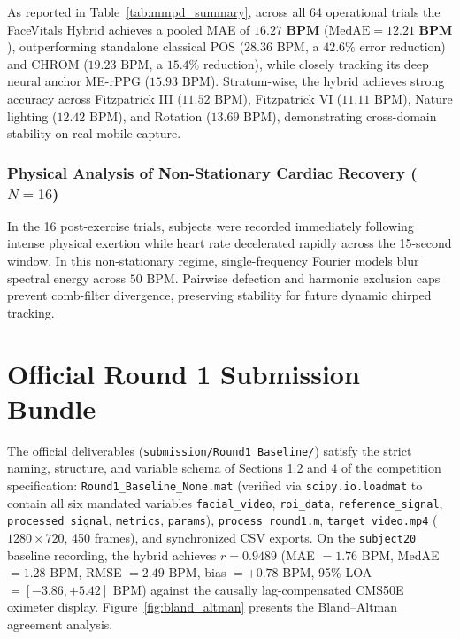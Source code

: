 \documentclass[conference]{IEEEtran}
\begin{document}
As reported in Table~\ref{tab:mmpd_summary}, across all 64 operational trials the FaceVitals Hybrid achieves a pooled MAE of $\mathbf{16.27\text{ BPM}}$ ($\text{MedAE} = \mathbf{12.21\text{ BPM}}$), outperforming standalone classical POS ($28.36\text{ BPM}$, a $42.6\%$ error reduction) and CHROM ($19.23\text{ BPM}$, a $15.4\%$ reduction), while closely tracking its deep neural anchor ME-rPPG ($15.93\text{ BPM}$). Stratum-wise, the hybrid achieves strong accuracy across Fitzpatrick III ($11.52\text{ BPM}$), Fitzpatrick VI ($11.11\text{ BPM}$), Nature lighting ($12.42\text{ BPM}$), and Rotation ($13.69\text{ BPM}$), demonstrating cross-domain stability on real mobile capture.

\subsubsection{Physical Analysis of Non-Stationary Cardiac Recovery ($N=16$)}
In the 16 post-exercise trials, subjects were recorded immediately following intense physical exertion while heart rate decelerated rapidly across the 15-second window. In this non-stationary regime, single-frequency Fourier models blur spectral energy across $50\text{ BPM}$. Pairwise defection and harmonic exclusion caps prevent comb-filter divergence, preserving stability for future dynamic chirped tracking.

\section{Official Round 1 Submission Bundle}

The official deliverables (\texttt{submission/Round1\_Baseline/}) satisfy
the strict naming, structure, and variable schema of Sections 1.2 and 4 of
the competition specification: \texttt{Round1\_Baseline\_None.mat} (verified
via \texttt{scipy.io.loadmat} to contain all six mandated variables
\texttt{facial\_video}, \texttt{roi\_data}, \texttt{reference\_signal},
\texttt{processed\_signal}, \texttt{metrics}, \texttt{params}),
\texttt{process\_round1.m}, \texttt{target\_video.mp4} ($1280\times720$,
450 frames), and synchronized CSV exports. On the \texttt{subject20}
baseline recording, the hybrid achieves $r = 0.9489$
(MAE $= 1.76\text{ BPM}$, MedAE $= 1.28\text{ BPM}$, RMSE $= 2.49\text{ BPM}$, bias $= +0.78\text{ BPM}$,
95\% LOA $= [-3.86, +5.42]\text{ BPM}$) against the causally lag-compensated
CMS50E oximeter display. Figure~\ref{fig:bland_altman} presents the
Bland--Altman agreement analysis.
\end{document}
